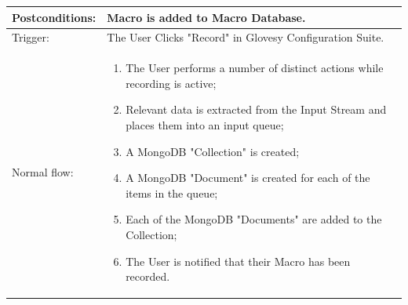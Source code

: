 \documentclass[12pt,a4paper,oneside]{book}
\theoremstyle{plain}
\numberwithin{equation}{chapter}
\begin{document}
\begin{longtable}{| p{3cm} | p{12cm} |}
\hline
Postconditions: & Macro is added to Macro Database.\\
\hline
Trigger: & The User Clicks "Record" in Glovesy Configuration Suite.\\
\hline
Normal flow: &\mbox{}\par\vspace{-\baselineskip}
\begin{enumerate}
\item The User performs a number of distinct actions while recording is active;
\item Relevant data is extracted from the Input Stream and places them into an input queue;
\item A MongoDB "Collection" is created;
\item A MongoDB "Document" is created for each of the items in the queue;
\item Each of the MongoDB "Documents" are added to the Collection;
\item The User is notified that their Macro has been recorded.
\end{enumerate}\\
\end{longtable}
\end{document}
